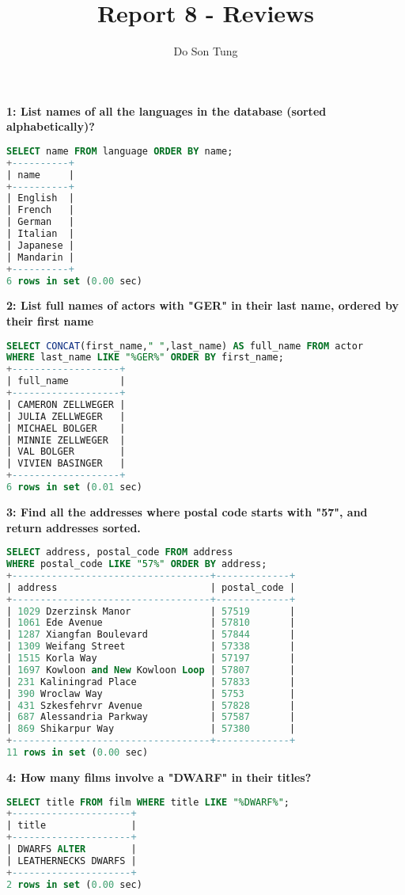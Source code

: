 \documentclass[12pt]{article}
\title{Report 8 - Reviews}
\author{Do Son Tung}
\date{} %
\begin{document}
\maketitle

\textbf{1: List names of all the languages in the database (sorted alphabetically)?}
\begin{lstlisting}[language=SQL]
SELECT name FROM language ORDER BY name;
+----------+
| name     |
+----------+
| English  |
| French   |
| German   |
| Italian  |
| Japanese |
| Mandarin |
+----------+
6 rows in set (0.00 sec)
\end{lstlisting}


\textbf{2: List full names of actors with "GER" in their last name, ordered by their first name}

\begin{lstlisting}[language=SQL]
SELECT CONCAT(first_name," ",last_name) AS full_name FROM actor
WHERE last_name LIKE "%GER%" ORDER BY first_name;
+-------------------+
| full_name         |
+-------------------+
| CAMERON ZELLWEGER |
| JULIA ZELLWEGER   |
| MICHAEL BOLGER    |
| MINNIE ZELLWEGER  |
| VAL BOLGER        |
| VIVIEN BASINGER   |
+-------------------+
6 rows in set (0.01 sec)

\end{lstlisting}

\pagebreak

\textbf{3: Find all the addresses where postal code starts with "57", and return addresses sorted.}
\begin{lstlisting}[language=SQL]
SELECT address, postal_code FROM address 
WHERE postal_code LIKE "57%" ORDER BY address;
+-----------------------------------+-------------+
| address                           | postal_code |
+-----------------------------------+-------------+
| 1029 Dzerzinsk Manor              | 57519       |
| 1061 Ede Avenue                   | 57810       |
| 1287 Xiangfan Boulevard           | 57844       |
| 1309 Weifang Street               | 57338       |
| 1515 Korla Way                    | 57197       |
| 1697 Kowloon and New Kowloon Loop | 57807       |
| 231 Kaliningrad Place             | 57833       |
| 390 Wroclaw Way                   | 5753        |
| 431 Szkesfehrvr Avenue            | 57828       |
| 687 Alessandria Parkway           | 57587       |
| 869 Shikarpur Way                 | 57380       |
+-----------------------------------+-------------+
11 rows in set (0.00 sec)
\end{lstlisting}

\textbf{4: How many films involve a "DWARF" in their titles?}
\begin{lstlisting}[language=SQL]
SELECT title FROM film WHERE title LIKE "%DWARF%";
+---------------------+
| title               |
+---------------------+
| DWARFS ALTER        |
| LEATHERNECKS DWARFS |
+---------------------+
2 rows in set (0.00 sec)
\end{lstlisting}
\end{document}
